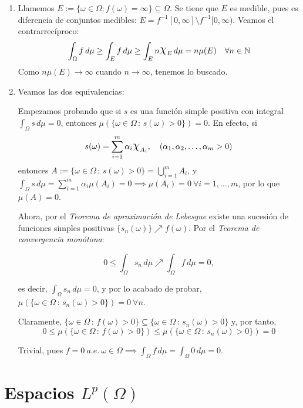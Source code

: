 \documentclass[11pt, a4paper]{article}
\makeatletter
\newif\IfInSansMode
\let\oldsf\sffamily
\renewcommand*{\sffamily}{\oldsf\mathversion{sans}\InSansModetrue}
\let\oldnorm\normalfont
\renewcommand*{\normalfont}{\oldnorm\InSansModefalse\mathversion{normal}}
\DeclareRobustCommand{\rchi}{{\Large \mathpalette\irchi\relax}}
\newcommand{\irchi}[2]{\raisebox{0.4\depth}{$#1\chi$}} %
\newcommand{\W}{\Omega}
\newcommand{\w}{\omega}
\renewenvironment{proof}[1][\proofname] {\par\pushQED{\qed}\normalfont\topsep6\p@\@plus6\p@\relax\trivlist\item[\hskip\labelsep\itshape\sffamily#1\@addpunct{.}]\ignorespaces}{\popQED\endtrivlist\@endpefalse}
\theoremstyle{theorem-style}
\theoremstyle{definition-style}
\theoremstyle{remark-style}
\theoremstyle{example-style}
\newenvironment{nlist}
{\begin{enumerate}
    \renewcommand\labelenumi{(\emph{\roman{enumi})}}}
  {\end{enumerate}}
\makeatother
\begin{document}
    \begin{proof} \hfill
    \begin{nlist}
    \item Llamemos $E := \{\w \in \W: f(\w) = \infty\} \subseteq \W$. Se tiene que $E$ es medible, pues es diferencia de conjuntos medibles: $E = f^{-1}[0,\infty] \setminus f^{-1}[0,\infty)$. Veamos el contrarrecíproco: $$\int_\W f\, d\mu \ge \int_E f\,d\mu \ge \int_E n\rchi_E\,d\mu = n\mu(E) \quad \forall n \in \mathbb{N}$$
    Como $n\mu(E) \to \infty$ cuando $n\to \infty$, tenemos lo buscado.
    \item Veamos las dos equivalencias:
    
    \boxed{\Rightarrow}  Empezamos probando que si $s$ es una función simple positiva con integral $\int_\Omega s \, d\mu = 0$, entonces $\mu(\{ \omega\in\Omega \, :\, s(\omega) >0\} ) = 0$. En efecto, si $$s(\omega)=\sum_{i=1}^m \alpha_i \text{\Large$\chi$}_{A_i}, \quad (\alpha_1,\alpha_2,\dots,\alpha_m > 0)$$ entonces $\displaystyle A:=\{ \omega\in\Omega \, :\, s(\omega) >0\} = \bigcup_{i=1}^m A_i$, y $\displaystyle \int_\Omega s \, d\mu = \sum_{i=1}^m \alpha_i \mu (A_i) = 0 \implies\mu(A_i)=0\ \forall i=1,\dots , m$, por lo que $\mu(A)=0 $.

Ahora, por el \textit{Teorema de aproximación de Lebesgue} existe una sucesión de funciones simples positivas $\{ s_n(\omega)\}\nearrow f(\omega)$. Por el \textit{Teorema de convergencia monótona}: 

$$0\leq \int_\Omega s_n \, d\mu \nearrow \int_\Omega f\, d\mu = 0,$$

es decir, $\displaystyle \int_\Omega s_n \, d\mu=0$, y por lo acabado de probar, $\mu(\{ \omega\in\Omega \, :\, s_n(\omega) >0\} ) = 0 \ \forall n$. 

Claramente, $\{ \omega\in\Omega \, :\,f(\omega) >0\}\subseteq \{ \omega\in\Omega \, :\, s_n(\omega) >0\}$ y, por tanto, $$0\leq \mu (\{ \omega\in\Omega \, :\,f(\omega) >0\} ) \leq \mu(\{ \omega\in\Omega \, :\, s_n(\omega) >0\} ) = 0$$

\boxed{\Leftarrow} Trivial, pues $f=0\ a.e.\ \w \in \W \implies \int_\W f\, d\mu = \int_\W 0\, d\mu = 0$.
\end{nlist}
\end{proof}

\newpage

\section{Espacios $L^p(\W)$}
\end{document}
